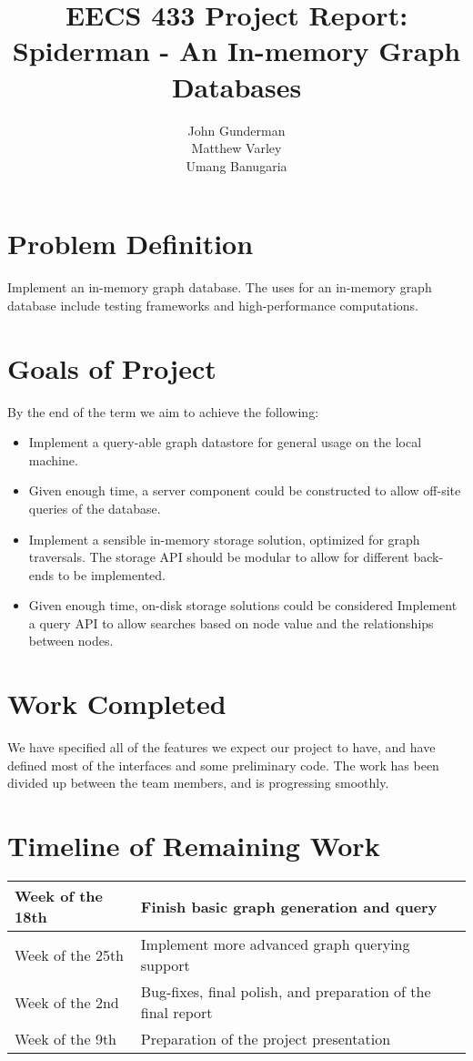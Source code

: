 \documentclass[11pt]{article}
\title{EECS 433 Project Report: Spiderman - An In-memory Graph Databases}
\author{John Gunderman\\
		Matthew Varley\\
		Umang Banugaria}
\date{}
\begin{document}
\maketitle
\tableofcontents

\section{Problem Definition}
Implement an in-memory graph database. The uses for an in-memory graph database include testing frameworks and high-performance computations.

\section{Goals of Project}
By the end of the term we aim to achieve the following:

\begin{itemize}
\item Implement a query-able graph datastore for general usage on the local machine.
\item Given enough time, a server component could be constructed to allow off-site queries of the database.
\item Implement a sensible in-memory storage solution, optimized for graph traversals. The storage API should be modular to allow for different back-ends to be implemented.
\item Given enough time, on-disk storage solutions could be considered
Implement a query API to allow searches based on node value and the relationships between nodes.
\end{itemize}

\section{Work Completed}

We have specified all of the features we expect our project to have, and have defined most of the interfaces and some preliminary code. The work has been divided up between the team members, and is progressing smoothly.

\section{Timeline of Remaining Work}

\begin{tabular}{|l|l|}
\hline
Week of the 18th & Finish basic graph generation and query\\\hline
Week of the 25th & Implement more advanced graph querying support\\\hline
Week of the 2nd & Bug-fixes, final polish, and preparation of the final report\\\hline
Week of the 9th & Preparation of the project presentation\\\hline
\end{tabular}
\end{document}

